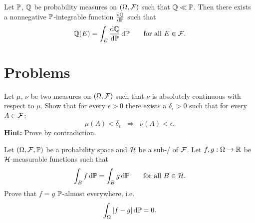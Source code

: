\begin{theorem} 
	Let $\mathbb P$, $\mathbb Q$ be probability measures on $(\Omega,\mathcal F)$ such that $\mathbb Q\ll \mathbb P$. Then there exists a nonnegative $\mathbb P$-integrable function $\frac{\mathrm{d}\mathbb Q}{\mathrm{d}\mathbb P}$ such that
	\[
		\mathbb Q(E) = \int_E \frac{\mathrm{d}\mathbb Q}{\mathrm{d}\mathbb P}\,\mathrm{d}\mathbb P\qquad\text{for all $E\in\mathcal F$}.
	\]
\end{theorem}




\section{Problems}

\begin{problem}
	Let $\mu$, $\nu$ be two measures on $(\Omega, \mathcal F)$ such that $\nu$ is absolutely continuous with respect to $\mu$. Show that for every $\epsilon > 0$ there exists a $\delta_\epsilon > 0$ such that for every $A \in \mathcal F$:
	\[
		\mu(A) < \delta_\epsilon\;\;\Longrightarrow\;\; \nu(A) < \epsilon.
	\]
	\textbf{Hint:} Prove by contradiction.
\end{problem}


\begin{problem}
Let $(\Omega, \mathcal F, \mathbb P)$ be a probability space and $\mathcal H$ be a sub-\sigalg/ of $\mathcal F$. Let $f, g : \Omega \to \mathbb R$ be $\mathcal H$-measurable functions such that
\[
	\int_B f \, \mathrm{d} \mathbb P = \int_B g \, \mathrm{d} \mathbb P\qquad\text{for all $B\in \mathcal H$}.
\]
Prove that $f=g$ $\mathbb P$-almost everywhere, i.e.
\[
	\int_\Omega |f - g| \, \mathrm{d} \mathbb P = 0.
\]
\end{problem}


